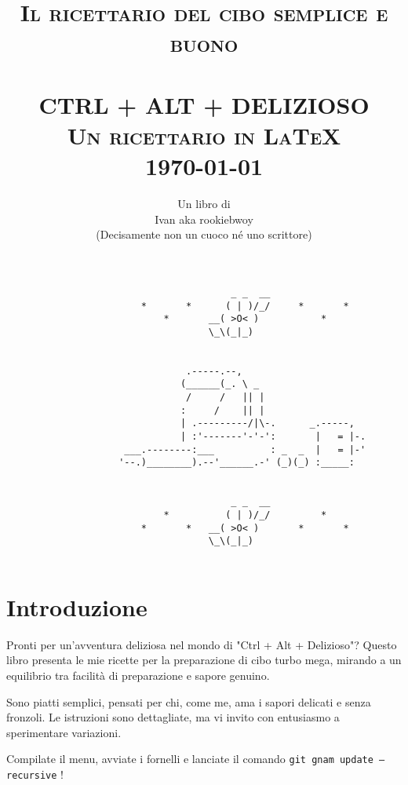 \documentclass[12pt]{article}
\title{	\normalsize \textsc{Il ricettario del cibo semplice e buono} 	%
		 	\\[1.5cm]								%
			\HRule{0.5pt} \\						%
			\LARGE \textbf{\uppercase{Ctrl + Alt + Delizioso}}\\[0.2cm]	%
			\normalsize \textsc{Un ricettario in LaTeX}
			\HRule{0.5pt} \\ [0.5cm]		%
			\normalsize \today			%
			\\ [2cm]
		}
\author{
		Un libro di\\	
		Ivan aka rookiebwoy\\ [0.2cm]
		\scriptsize(Decisamente non un cuoco né uno scrittore)\\ [1cm]
		}
\makeatletter
\def\printtitle{%
    {\centering \@title \par}}
\def\printauthor{%
    {\centering \large \@author}}
\makeatother
\begin{document}
\thispagestyle{empty}		%

\printtitle					%
\begin{lstlisting}
										_ _  __
						*		*	   ( | )/_/		*		*
							*		__( >O< )  			*
									\_\(_|_)   


					            .-----.--,
					           (______(_. \ _
					            /     /   || |
					           :     /    || |
					           | .---------/|\-.      _.-----,
					           | :'-------'-'-':       |   = |-.
					 ___.--------:___          : _  _  |   = |-'
					'--.)________).--'______.-' (_)(_) :_____:


										_ _  __
							*		   ( | )/_/			*
						*		*	__( >O< )  		*		*
									\_\(_|_)   
	
\end{lstlisting}
  	\vfill
\printauthor				%
\newpage

\pagestyle{fancy}

\chead{ } %

\setcounter{page}{1}		%
\section*{Introduzione}
Pronti per un'avventura deliziosa nel mondo di "Ctrl + Alt + Delizioso"? 
Questo libro presenta le mie ricette per la preparazione di cibo turbo mega, 
mirando a un equilibrio tra facilità di preparazione e sapore genuino. 

Sono piatti semplici, pensati per chi, come me, ama i sapori delicati e senza fronzoli. 
Le istruzioni sono dettagliate, ma vi invito con entusiasmo a sperimentare variazioni. 

Compilate il menu, avviate i fornelli e lanciate il comando \texttt{git gnam update ---recursive} !
\end{document}
